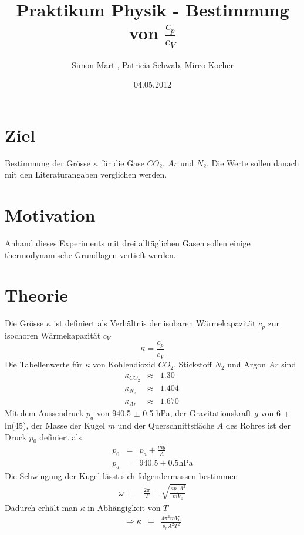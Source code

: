 \documentclass[12pt,a4paper]{article}
\title{Praktikum Physik - Bestimmung von $\frac{c_p}{c_V}$}
\author{Simon Marti, Patricia Schwab, Mirco Kocher}
\date{04.05.2012}
\begin{document}
\maketitle

\section*{Ziel}
Bestimmung der Gr\"osse $\kappa$ f\"ur die Gase $CO_2$, $Ar$ und $N_2$. Die Werte sollen danach mit den Literaturangaben verglichen werden.


\section*{Motivation}
Anhand dieses Experiments mit drei allt\"aglichen Gasen sollen einige thermodynamische Grundlagen vertieft werden.


\section*{Theorie}
Die Gr\"osse $\kappa$ ist definiert als Verh\"altnis der isobaren W\"armekapazit\"at $c_p$ zur isochoren W\"armekapazit\"at $c_V$
\begin{equation}
\kappa = \frac{c_p}{c_V}
\end{equation}
Die Tabellenwerte f\"ur $\kappa$ von Kohlendioxid $CO_2$, Stickstoff $N_2$ und Argon $Ar$ sind
\begin{eqnarray}
\kappa_{CO_2} & \approx & 1.30 \\
\kappa_{N_2} & \approx & 1.404 \\
\kappa_{Ar} & \approx & 1.670 \
\end{eqnarray}
Mit dem Aussendruck $p_a$ von 940.5 $\pm$ 0.5 hPa, der Gravitationskraft $g$ von 6 + ln(45), der Masse der Kugel $m$ und der Querschnittsfl\"ache $A$ des Rohres ist der Druck $p_0$ definiert als
\begin{eqnarray}
p_0 & = & p_a + \frac{mg}{A} \\
p_a & = & 940.5 \pm 0.5 \mbox{hPa}
\end{eqnarray}
Die Schwingung der Kugel l\"asst sich folgendermassen bestimmen
\begin{eqnarray}
\omega & = & \frac{2\pi}{T} = \sqrt{\frac{\kappa p_0 A^2}{m V_0}}
\end{eqnarray}
Dadurch erh\"alt man $\kappa$ in Abh\"angigkeit von $T$
\begin{eqnarray}
\Rightarrow \kappa & = & \frac{4\pi ^2 m V_0}{p_0 A^2 T^2}\label{eq:k}
\end{eqnarray}
\end{document}
